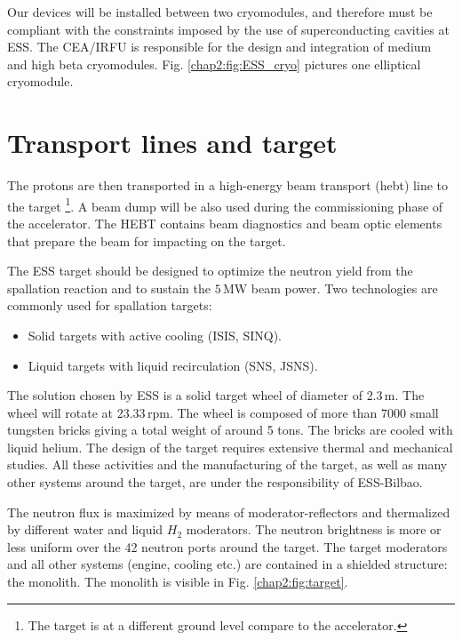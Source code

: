 \begin{refsection}
  Our devices will be installed between two cryomodules, and therefore must be compliant with the constraints imposed by the use of superconducting cavities at ESS. The CEA/IRFU is responsible for the design and integration of medium and high beta cryomodules. Fig. \ref{chap2:fig:ESS_cryo} pictures one elliptical cryomodule.

  

  \section{Transport lines and target}
  The protons are then transported in a high-energy beam transport (\acrshort{hebt}) line to the target \footnote{The target is at a different ground level compare to the accelerator.}. A beam dump will be also used during the commissioning phase of the accelerator. The HEBT contains beam diagnostics and beam optic elements that prepare the beam for impacting on the target.

  The ESS target should be designed to optimize the neutron yield from the spallation reaction and to sustain the $5\,\mathrm{MW}$ beam power. Two technologies are commonly used for spallation targets:
  \begin{itemize}
    \item Solid targets with active cooling (ISIS, SINQ).
    \item Liquid targets with liquid recirculation (SNS, JSNS).
  \end{itemize}
  The solution chosen by ESS is a solid target wheel of diameter of $2.3\,\mathrm{m}$. The wheel will rotate at $23.33\,\mathrm{rpm}$. The wheel is composed of more than $7000$ small tungsten bricks giving a total weight of around 5 tons. The bricks are cooled with liquid helium. The design of the target requires extensive thermal and mechanical studies. All these activities and the manufacturing of the target, as well as many other systems around the target, are under the responsibility of ESS-Bilbao.

  The neutron flux is maximized by means of moderator-reflectors and thermalized by different water and liquid $H_{2}$ moderators. The neutron brightness is more or less uniform over the 42 neutron ports around the target. The target moderators and all other systems (engine, cooling etc.) are contained in a shielded structure: the monolith. The monolith is visible in Fig. \ref{chap2:fig:target}.

  


\end{refsection}
